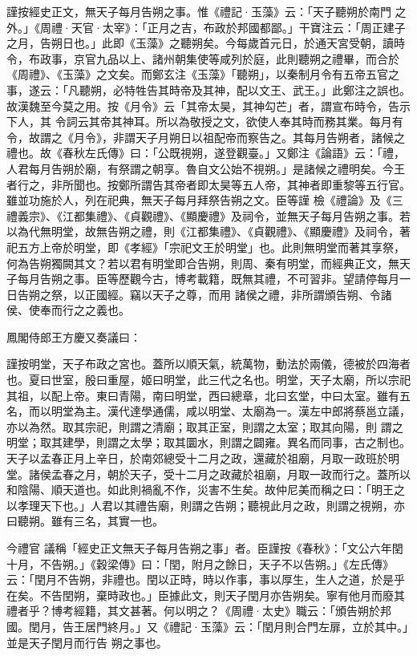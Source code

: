 \begin{pinyinscope}
 謹按經史正文，無天子每月告朔之事。惟《禮記·玉藻》云：「天子聽朔於南門
 之外。」《周禮·天官·太宰》：「正月之吉，布政於邦國都鄙。」干寶注云：「周正建子之月，告朔日也。」此即《玉藻》之聽朔矣。今每歲首元日，於通天宮受朝，讀時令，布政事，京官九品以上、諸州朝集使等咸列於庭，此則聽朔之禮畢，而合於《周禮》、《玉藻》之文矣。而鄭玄注《玉藻》「聽朔」，以秦制月令有五帝五官之事，遂云：「凡聽朔，必特牲告其時帝及其神，配以文王、武王。」此鄭注之誤也。故漢魏至今莫之用。按《月令》云「其帝太昊，其神勾芒」者，謂宣布時令，告示下人，其
 令詞云其帝其神耳。所以為敬授之文，欲使人奉其時而務其業。每月有令，故謂之《月令》，非謂天子月朔日以祖配帝而察告之。其每月告朔者，諸候之禮也。故《春秋左氏傳》曰：「公既視朔，遂登觀臺。」又鄭注《論語》云：「禮，人君每月告朔於廟，有祭謂之朝享。魯自文公始不視朔。」是諸候之禮明矣。今王者行之，非所聞也。按鄭所謂告其帝者即太昊等五人帝，其神者即重黎等五行官。雖並功施於人，列在祀典，無天子每月拜祭告朔之文。臣等謹
 檢《禮論》及《三禮義宗》、《江都集禮》、《貞觀禮》、《顯慶禮》及祠令，並無天子每月告朔之事。若以為代無明堂，故無告朔之禮，則《江都集禮》、《貞觀禮》、《顯慶禮》及祠令，著祀五方上帝於明堂，即《孝經》「宗祀文王於明堂」也。此則無明堂而著其享祭，何為告朔獨闕其文？若以君有明堂即合告朔，則周、秦有明堂，而經典正文，無天子每月告朔之事。臣等歷觀今古，博考載籍，既無其禮，不可習非。望請停每月一日告朔之祭，以正國經。竊以天子之尊，而用
 諸侯之禮，非所謂頒告朔、令諸侯、使奉而行之之義也。



 鳳閣侍郎王方慶又奏議曰：



 謹按明堂，天子布政之宮也。蓋所以順天氣，統萬物，動法於兩儀，德被於四海者也。夏曰世室，殷曰重屋，姬曰明堂，此三代之名也。明堂，天子太廟，所以宗祀其祖，以配上帝。東曰青陽，南曰明堂，西曰總章，北曰玄堂，中曰太室。雖有五名，而以明堂為主。漢代達學通儒，咸以明堂、太廟為一。漢左中郎將蔡邕立議，亦以為然。取其宗祀，則謂之清廟；取其正室，則謂之太室；取其向陽，則
 謂之明堂；取其建學，則謂之太學；取其圜水，則謂之闢雍。異名而同事，古之制也。天子以孟春正月上辛日，於南郊總受十二月之政，還藏於祖廟，月取一政班於明堂。諸侯孟春之月，朝於天子，受十二月之政藏於祖廟，月取一政而行之。蓋所以和陰陽、順天道也。如此則禍亂不作，災害不生矣。故仲尼美而稱之曰：「明王之以孝理天下也。」人君以其禮告廟，則謂之告朔；聽視此月之政，則謂之視朔，亦曰聽朔。雖有三名，其實一也。



 今禮官
 議稱「經史正文無天子每月告朔之事」者。臣謹按《春秋》：「文公六年閏十月，不告朔。」《穀梁傳》曰：「閏，附月之餘日，天子不以告朔。」《左氏傳》云：「閏月不告朔，非禮也。閏以正時，時以作事，事以厚生，生人之道，於是乎在矣。不告閏朔，棄時政也。」臣據此文，則天子閏月亦告朔矣。寧有他月而廢其禮者乎？博考經籍，其文甚著。何以明之？《周禮·太史》職云：「頒告朔於邦國。閏月，告王居門終月。」又《禮記·玉藻》云：「閏月則合門左扉，立於其中。」並是天子閏月而行告
 朔之事也。




\end{pinyinscope}
